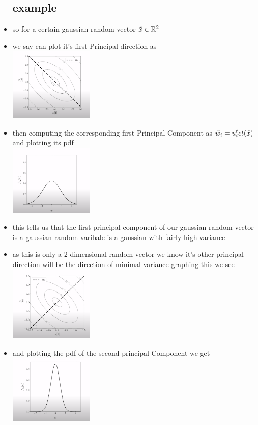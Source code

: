 \documentclass{article}
\begin{document}
\begin{itemize}
\subsection*{example}
\item so for a certain gaussian random vector $\Tilde{x}\in \mathbb{R}^{2}$
\item we say can plot it's first Principal direction as \\ \includegraphics*[width=4cm]{notes/week_8/vedio_2/immages/v2_4.png}
\item then computing the corresponding first Principal Component as $\Tilde{w}_i=u_i^{t}ct(\Tilde{x})$ and plotting its pdf    \\  \includegraphics*[width=4cm]{notes/week_8/vedio_2/immages/v2_5.png}
\item this tells us that the first principal component of our gaussian random vector is a gaussian random varibale is a gaussian with fairly high variance
\item as this is only a 2 dimensional random vector we know it's other principal direction will be the direction of minimal variance graphing this we see \\  \includegraphics*[width=4cm]{notes/week_8/vedio_2/immages/v2_6.png}
\item and plotting the pdf of the second principal Component we get \\ \includegraphics*[width=4cm]{notes/week_8/vedio_2/immages/v2_7.png} 

\end{itemize}
\end{document}

